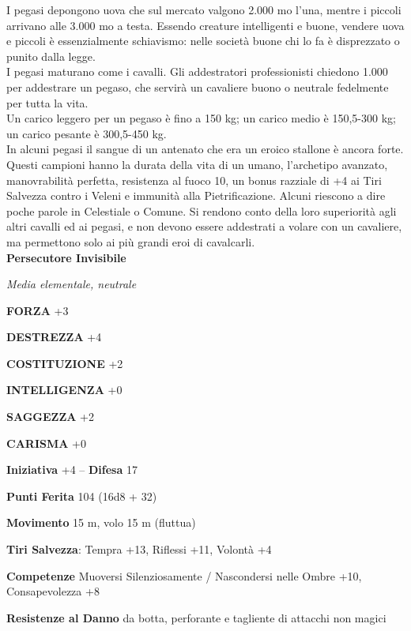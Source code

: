 \begin{multicols}{2}
I pegasi depongono uova che sul mercato valgono 2.000 mo l'una, mentre i piccoli arrivano alle 3.000 mo a testa. Essendo creature intelligenti e buone, vendere uova e piccoli è essenzialmente schiavismo: nelle società buone chi lo fa è disprezzato o punito dalla legge.\\

I pegasi maturano come i cavalli. Gli addestratori professionisti chiedono 1.000 per addestrare un pegaso, che servirà un cavaliere buono o neutrale fedelmente per tutta la vita.\\

Un carico leggero per un pegaso è fino a 150 kg; un carico medio è 150,5-300 kg; un carico pesante è 300,5-450 kg.\\

In alcuni pegasi il sangue di un antenato che era un eroico stallone è ancora forte. Questi campioni hanno la durata della vita di un umano, l'archetipo avanzato, manovrabilità perfetta, resistenza al fuoco 10, un bonus razziale di +4 ai Tiri Salvezza contro i Veleni e immunità alla Pietrificazione. Alcuni riescono a dire poche parole in Celestiale o Comune. Si rendono conto della loro superiorità agli altri cavalli ed ai pegasi, e non devono essere addestrati a volare con un cavaliere, ma permettono solo ai più grandi eroi di cavalcarli.\\


\medskip{}\textbf{Persecutore Invisibile}

\emph{Media elementale, neutrale}

\textbf{FORZA} +3

\textbf{DESTREZZA} +4

\textbf{COSTITUZIONE} +2

\textbf{INTELLIGENZA} +0

\textbf{SAGGEZZA} +2

\textbf{CARISMA} +0

\textbf{Iniziativa} +4 -- \textbf{Difesa} 17

\textbf{Punti Ferita} 104 (16d8 + 32)

\textbf{Movimento} 15 m, volo 15 m (fluttua)

\textbf{Tiri Salvezza}: Tempra +13, Riflessi +11, Volontà +4

\textbf{Competenze} Muoversi Silenziosamente / Nascondersi nelle Ombre +10, Consapevolezza +8

\textbf{Resistenze al Danno} da botta, perforante e tagliente di attacchi non magici


\end{multicols}

